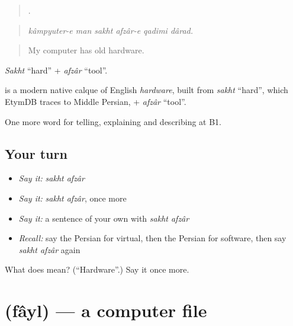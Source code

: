 \begin{quote}
     .
\end{quote}

\begin{quote}
\emph{kâmpyuter-e man sakht afzâr-e qadimi dârad.}
\end{quote}

\begin{quote}
My computer has old hardware.
\end{quote}

\emph{Sakht} \textquotedblleft{}hard\textquotedblright{} + \emph{afzâr} \textquotedblleft{}tool\textquotedblright{}.

\begin{cousinweb}
\textbf{ } is a modern native calque of English \emph{hardware}, built from \emph{sakht} \textquotedblleft{}hard\textquotedblright{}, which EtymDB traces to Middle Persian, + \emph{afzâr} \textquotedblleft{}tool\textquotedblright{}.
\end{cousinweb}

\begin{grammarlens}[title={What you've built}]
One more word for telling, explaining and describing at B1.
\end{grammarlens}

\subsection*{Your turn}
\begin{itemize}
\raggedright
  \item \emph{Say it:} \emph{sakht afzâr}
  \item \emph{Say it:} \emph{sakht afzâr}, once more
  \item \emph{Say it:} a sentence of your own with \emph{sakht afzâr}
  \item \emph{Recall:} say the Persian for virtual, then the Persian for software, then say \emph{sakht afzâr} again
\end{itemize}

\begin{tcolorbox}[breakable,colback=teal!4,colframe=teal!35!black,title={Before you move on}]
What does   mean? (\textquotedblleft{}Hardware\textquotedblright{}.) Say it once more.
\end{tcolorbox}
\section[\texorpdfstring{\fa{فایل} (fâyl)}{فایل (fâyl)}]{ (fâyl) — a computer file}

